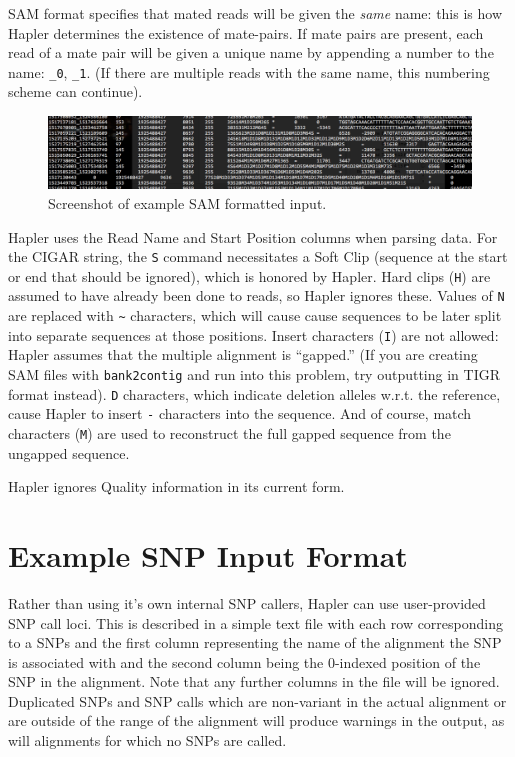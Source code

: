 \documentclass[11pt]{llncs}
\begin{document}
SAM format specifies that mated reads will be given the \emph{same} name: this is how Hapler determines the existence of mate-pairs. 
If mate pairs are present, each read of a mate pair will be given a unique name by appending a number to the name:
\verb=_0=, \verb=_1=. (If there are multiple reads with the same name, this numbering scheme can continue).

\begin{figure}[!h]
\centering
   \includegraphics[width=\textwidth]{graphics/Example_sam}
   \caption{Screenshot of example SAM formatted input.}
   \label{exampleSAM}
\end{figure}

Hapler uses the Read Name and Start Position columns when parsing data. For the CIGAR string, the \verb=S= command necessitates a Soft Clip (sequence 
at the start or end that should be ignored), which is honored by Hapler. Hard clips (\verb=H=) are assumed to have already been done to reads, so 
Hapler ignores these. Values of \verb=N= are replaced with \verb=~= characters, which will cause cause sequences to be later split into separate 
sequences at those positions. Insert characters (\verb=I=) are not allowed: Hapler assumes that the multiple alignment is ``gapped.'' (If you are 
creating SAM files with \texttt{bank2contig} and run into this problem, try outputting in TIGR format instead). \verb=D= characters, which indicate 
deletion alleles w.r.t. the reference, cause Hapler to insert \verb=-= characters into the sequence. And of course, match characters (\verb=M=) are 
used to reconstruct the full gapped sequence from the ungapped sequence.

Hapler ignores Quality information in its current form.


\section{Example SNP Input Format}
\label{exampleSnpInputFormat}

Rather than using it's own internal SNP callers, Hapler can use user-provided SNP call loci. This is described in a simple text file with each row 
corresponding to a SNPs and the first column representing the name of the alignment the SNP is associated with and the second column being the 
0-indexed position of the SNP in the alignment. Note that any further columns in the file will be ignored. Duplicated SNPs and SNP calls which are 
non-variant in the actual alignment or are outside of the range of the alignment will produce warnings in the output, as will alignments for which no 
SNPs are called.
\end{document}
